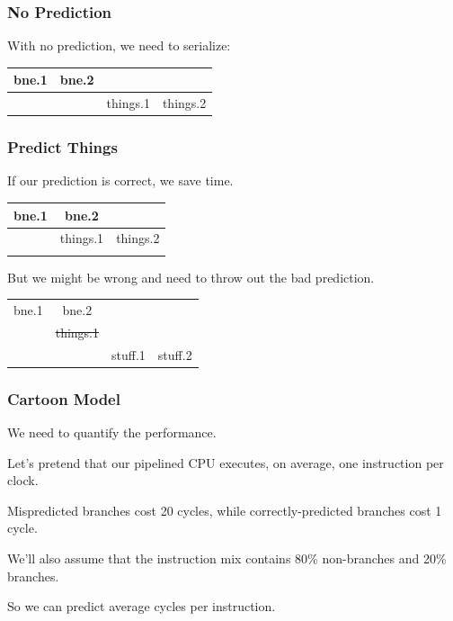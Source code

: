 \begin{frame}
\frametitle{No Prediction}

With no prediction, we need to serialize:

\begin{center}
\begin{tabular}{c|c|c|c}
bne.1 & bne.2 \\ \hline
& & things.1 & things.2
\end{tabular}
\end{center}

\end{frame}



\begin{frame}
\frametitle{Predict Things}
If our prediction is correct, we save time.

\begin{center}
\begin{tabular}{c|c|c}
bne.1 & bne.2 \\ \hline
& things.1 & things.2 \\
\\
\end{tabular}
\end{center}

But we might be wrong and need to throw out the bad prediction.

\begin{center}
\begin{tabular}{c|c|c|c}
bne.1 & bne.2 \\ \cline{1-2}
& \sout{things.1} \\ \hline
& & stuff.1 & stuff.2
\end{tabular}
\end{center}


\end{frame}



\begin{frame}
\frametitle{Cartoon Model}

We need to quantify the performance.


Let's pretend that our pipelined
CPU executes, on average, one instruction per clock.

Mispredicted branches cost 20 cycles, while correctly-predicted
branches cost 1 cycle. 

We'll also assume that the instruction
mix contains 80\% non-branches and 20\% branches. 

So we can predict
average cycles per instruction.


\end{frame}

